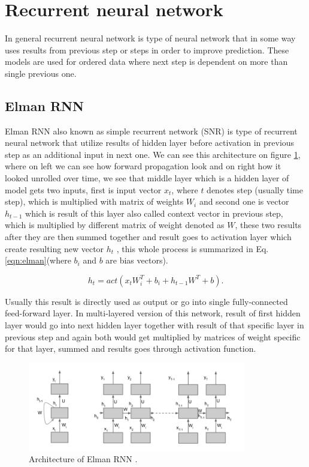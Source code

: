 \section{Recurrent neural network}
\label{theoryRNN}

In general recurrent neural network is type of neural network that in some way uses results from previous step or steps in order to improve prediction. These models are used for ordered data where next step is dependent on more than single previous one.

\subsection{Elman RNN}

Elman RNN also known as simple recurrent network (SNR) is type of recurrent neural network that utilize results of hidden layer before activation in previous step as an additional input in next one. We can see this architecture on figure \ref{fig:elman_arch}, where on left we can see how forward propagation look and on right how it looked unrolled over time, we see that middle layer which is a hidden layer of model gets two inputs, first is input vector $x_t$, where $t$ denotes step (usually time step), which is multiplied with matrix of weights $W_i$ and second one is vector $h_{t-1}$ which is result of this layer also called context vector in previous step, which is multiplied by different matrix of weight denoted as $W$, these two results after they are then summed together and result goes to activation layer which create resulting new vector $h_t$ \cite{elman}, this whole process is summarized in Eq. \ref{eqn:elman}(where $b_i$ and $b$ are bias vectors).

\begin{equation}
	\label{eqn:elman}
	h_t = act(x_t W^T_i + b_i + h_{t-1} W^T + b).
\end{equation} 

Usually this result is directly used as output or go into single fully-connected feed-forward layer. In multi-layered version of this network, result of first hidden layer would go into next hidden layer together with result of that specific layer in previous step and again both would get multiplied by matrices of weight specific for that layer, summed and results goes through activation function.

\begin{figure}[!h]
	\centering
	
	\includegraphics[width=0.85\textwidth]{images/Elman_RNN_architecture.png}
	
	\caption{Architecture of Elman RNN \cite{elman_img}.}
	\label{fig:elman_arch}
\end{figure}

